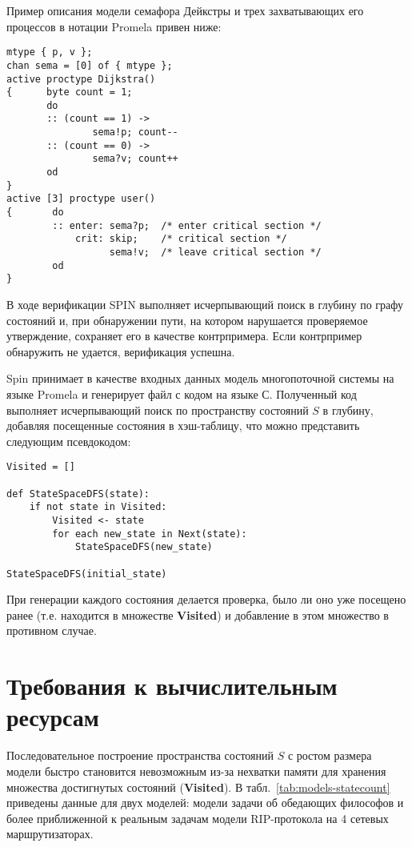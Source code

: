 \documentclass[12pt,a4paper,fleqn]{article}
\newcommand{\Code}[1]{\textbf{\mbox{#1}}}
\begin{document}
Пример описания модели семафора Дейкстры и трех захватывающих его процессов в нотации
Promela привен ниже:

\begin{lstlisting}[language=Promela]
mtype { p, v };
chan sema = [0] of { mtype };
active proctype Dijkstra()
{      byte count = 1;
       do
       :: (count == 1) ->
               sema!p; count--
       :: (count == 0) ->
               sema?v; count++
       od
}
active [3] proctype user()
{       do
        :: enter: sema?p;  /* enter critical section */
            crit: skip;    /* critical section */
                  sema!v;  /* leave critical section */
        od
}  
\end{lstlisting}

В ходе верификации SPIN выполняет исчерпывающий поиск в глубину по графу состояний и, при
обнаружении пути, на котором нарушается проверяемое утверждение, сохраняет его в качестве
контрпримера. Если контрпример обнаружить не удается, верификация успешна.

Spin принимает в качестве входных данных модель многопоточной системы на языке Promela и
генерирует файл с кодом на языке С. Полученный код выполняет исчерпывающий поиск по
пространству состояний $S$ в глубину, добавляя посещенные состояния в хэш-таблицу, что
можно представить следующим псевдокодом:

\begin{lstlisting}[style=pseudocode]
Visited = []

def StateSpaceDFS(state):
    if not state in Visited:
        Visited <- state
        for each new_state in Next(state):
            StateSpaceDFS(new_state)

StateSpaceDFS(initial_state)
\end{lstlisting}

При генерации каждого состояния делается проверка, было ли оно уже посещено ранее (т.е. находится в
множестве \Code{Visited}) и добавление в этом множество в противном случае.

\section{Требования к вычислительным ресурсам}

Последовательное построение пространства состояний $S$ с ростом размера модели быстро
становится невозможным из-за нехватки памяти для хранения множества достигнутых состояний
(\Code{Visited}). В табл.~\ref{tab:models-statecount} приведены данные для двух моделей:
модели задачи об обедающих философов и более приближенной к реальным задачам модели
RIP-протокола на 4 сетевых маршрутизаторах.
\end{document}
